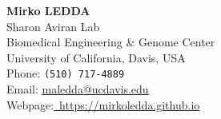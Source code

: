 \documentclass{CV}
\newcommand{\mail}[1]{\href{mailto:#1}{#1}}
\begin{document}
\begin{center}
	{\textbf{\LARGE Mirko LEDDA}}\\
	Sharon Aviran Lab\\
	Biomedical Engineering \& Genome Center\\
	University of California, Davis, USA\\
	Phone: \texttt{(510) 717-4889}\\
	Email: \mail{maledda@ucdavis.edu}\\
	Webpage:\href{https://mirkoledda.github.io}{~https://mirkoledda.github.io}\\
\end{center}
~







\vspace{-1.5em}
\end{document}
